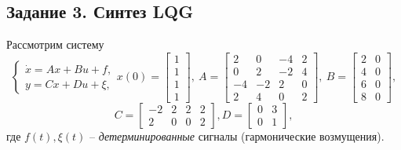 \documentclass[a4paper, 12pt]{article}
\begin{document}
    \subsection{Задание 3. Синтез LQG}
    Рассмотрим систему
    $$
    \begin{cases}
        \dot{x}=Ax+Bu+f,\\
        y=Cx+Du+\xi,
    \end{cases} x(0)=\begin{bmatrix}
        1\\1\\1\\1
    \end{bmatrix},\ A=\begin{bmatrix}
        2 &0 &-4 &2\\
        0 &2 &-2 &4\\
        -4 &-2 &2 &0\\
        2 &4 &0 &2
    \end{bmatrix},\ B=\begin{bmatrix}
        2 &0\\
        4 &0\\
        6 &0\\
        8 &0
    \end{bmatrix},
    $$
    $$
    C=\begin{bmatrix}
        -2 &2 &2 &2\\
        2 &0 &0 &2
    \end{bmatrix}, D=\begin{bmatrix}
        0 &3\\
        0 &1
    \end{bmatrix},
    $$
    где $f(t),\xi(t)$ -- \textit{детерминированные} сигналы (гармонические возмущения).

    
\end{document}
